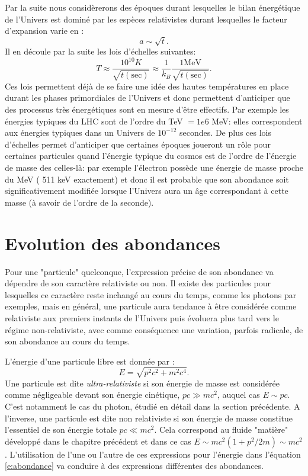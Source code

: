 Par la suite nous considèrerons des époques durant lesquelles le bilan énergétique de l'Univers est dominé par les espèces relativistes durant lesquelles le facteur d'expansion varie en :
\begin{equation}
a\sim \sqrt t.
\end{equation}
Il en découle par la suite les lois d'échelles suivantes:
\begin{equation}
T\approx\frac{10^{10} K}{\sqrt{t\mathrm{(sec)}}} \approx \frac{1}{k_B}\frac{1 \mathrm{MeV}}{\sqrt{t\mathrm{(sec)}}}.
\end{equation}
Ces lois permettent déjà de se faire une idée des hautes températures en place durant les phases primordiales de l'Univers et donc permettent d'anticiper que des processus très énergétiques sont en mesure d'être effectifs. Par exemple les énergies typiques du LHC sont de l'ordre du TeV $=1e6$ MeV: elles correspondent aux énergies typiques dans un Univers de $10^{-12}$ secondes. De plus ces lois d'échelles permet d'anticiper que certaines époques joueront un rôle pour certaines particules quand l'énergie typique du cosmos est de l'ordre de l'énergie de masse des celles-là: par exemple l'électron possède une énergie de masse proche du MeV ( 511 keV exactement) et donc il est probable que son abondance soit significativement modifiée lorsque l'Univers aura un âge correspondant à cette masse (à savoir de l'ordre de la seconde).


\section{Evolution des abondances}
Pour une "particule" quelconque, l'expression précise de son abondance va dépendre de son caractère relativiste ou non. Il existe des particules pour lesquelles ce caractère reste inchangé au cours du temps, comme les photons par exemples, mais en général, une particule aura tendance à être considérée comme relativiste aux premiers instants de l'Univers puis évoluera plus tard vers le régime non-relativiste, avec comme conséquence une variation, parfois radicale, de son abondance au cours du temps.

L'énergie d'une particule libre est donnée par :
\begin{equation}
E=\sqrt{p^2c^2+m^2c^4}.
\end{equation}
 Une particule est dite \textit{ultra-relativiste} si son énergie de masse est considérée comme négligeable devant son énergie cinétique, $pc\gg mc^2$, auquel cas $E\sim pc$. C'est notamment le cas du photon, étudié en détail dans la section précédente. A l'inverse, une particule est dite non relativiste si son énergie de masse constitue l'essentiel de son énergie totale $pc \ll mc^2$. Cela correspond au fluide "matière" développé dans le chapitre précédent et dans ce cas $E\sim mc^2 (1+ p^2/2m) \sim mc^2$. L'utilisation de l'une ou l'autre de ces expressions pour l'énergie dans l'équation \ref{e:abondance} va conduire à des expressions différentes des abondances.
 

